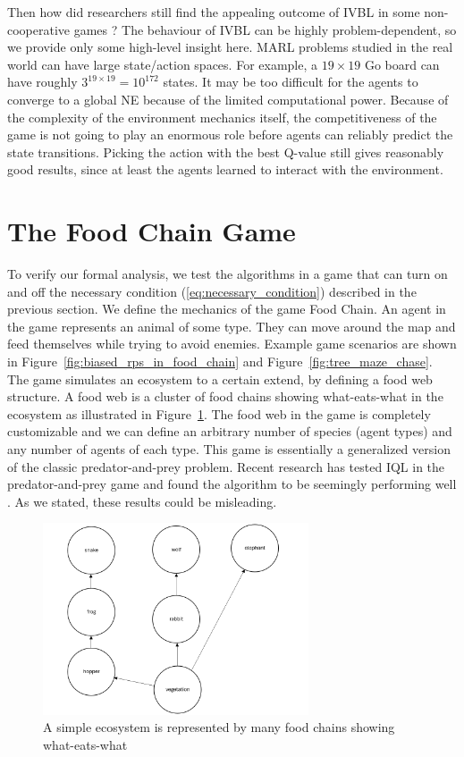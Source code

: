 \documentclass[]{interact}
\theoremstyle{plain}%
\theoremstyle{definition}
\theoremstyle{remark}
\begin{document}
Then how did researchers still find the appealing outcome of IVBL in some non-cooperative games \cite{bjornsson2009cadiaplayer, jiang2018q, kopacz2023evaluating, qu2020distributed}? The behaviour of IVBL can be highly problem-dependent, so we provide only some high-level insight here. MARL problems studied in the real world can have large state/action spaces. For example, a $19 \times 19$ Go board can have roughly $3^{19 \times 19} = 10^{172}$ states. It may be too difficult for the agents to converge to a global NE because of the limited computational power. Because of the complexity of the environment mechanics itself, the competitiveness of the game is not going to play an enormous role before agents can reliably predict the state transitions. Picking the action with the best Q-value still gives reasonably good results, since at least the agents learned to interact with the environment.

\section{The Food Chain Game}
To verify our formal analysis, we test the algorithms in a game that can turn on and off the necessary condition (\ref{eq:necessary_condition}) described in the previous section. We define the mechanics of the game Food Chain. An agent in the game represents an animal of some type. They can move around the map and feed themselves while trying to avoid enemies. Example game scenarios are shown in Figure~\ref{fig:biased_rps_in_food_chain} and Figure~\ref{fig:tree_maze_chase}. The game simulates an ecosystem to a certain extend, by defining a food web structure. A food web is a cluster of food chains showing what-eats-what in the ecosystem as illustrated in Figure~\ref{fig:food_web}. The food web in the game is completely customizable and we can define an arbitrary number of species (agent types) and any number of agents of each type. This game is essentially a generalized version of the classic predator-and-prey problem. Recent research has tested IQL in the predator-and-prey game and found the algorithm to be seemingly performing well \cite{kopacz2023evaluating}. As we stated, these results could be misleading.

\begin{figure}
\centering
\includegraphics[width=0.7\textwidth]{images/food_web.png}
\caption{A simple ecosystem is represented by many food chains showing what-eats-what}
\label{fig:food_web}
\end{figure}
\end{document}
